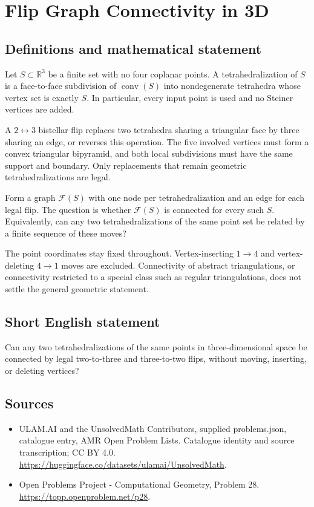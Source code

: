 \documentclass[11pt,a4paper]{article}
\begin{document}
\section*{Flip Graph Connectivity in 3D}\label{statement}

\subsection{Definitions and mathematical statement}
Let $S\subset\mathbb R^3$ be a finite set with no four coplanar points.
A tetrahedralization of $S$ is a face-to-face subdivision of
$\operatorname{conv}(S)$ into nondegenerate tetrahedra whose vertex set
is exactly $S$. In particular, every input point is used and no
Steiner vertices are added.

A $2\leftrightarrow3$ bistellar flip replaces two tetrahedra sharing
a triangular face by three sharing an edge, or reverses this operation.
The five involved vertices must form a convex triangular bipyramid,
and both local subdivisions must have the same support and boundary.
Only replacements that remain geometric tetrahedralizations are legal.

Form a graph $\mathcal F(S)$ with one node per tetrahedralization and
an edge for each legal flip. The question is whether $\mathcal F(S)$
is connected for every such $S$. Equivalently, can any two
tetrahedralizations of the same point set be related by a finite
sequence of these moves?

The point coordinates stay fixed throughout. Vertex-inserting
$1\to4$ and vertex-deleting $4\to1$ moves are excluded. Connectivity
of abstract triangulations, or connectivity restricted to a special
class such as regular triangulations, does not settle the general
geometric statement.
\subsection{Short English statement}
Can any two tetrahedralizations of the same points in three-dimensional
space be connected by legal two-to-three and three-to-two flips, without
moving, inserting, or deleting vertices?
\subsection{Sources}
\begin{itemize}
\item[S1] ULAM.AI and the UnsolvedMath Contributors, supplied problems.json, catalogue entry, AMR Open Problem Lists. Catalogue identity and source transcription; CC BY 4.0.
\url{https://huggingface.co/datasets/ulamai/UnsolvedMath}.
\item[S2] Open Problems Project - Computational Geometry, Problem 28. 
\url{https://topp.openproblem.net/p28}.
\end{itemize}
\end{document}

